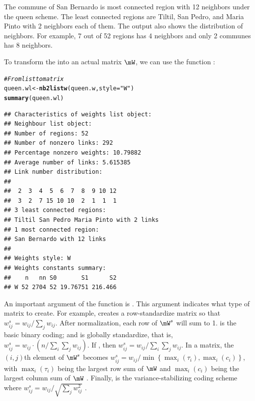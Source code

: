 \documentclass[english,12pt]{book}\usepackage[]{graphicx}\usepackage[]{xcolor}
\makeatletter
\newcommand{\hlstr}[1]{\textcolor[rgb]{0.192,0.494,0.8}{#1}}%
\newcommand{\hlcom}[1]{\textcolor[rgb]{0.678,0.584,0.686}{\textit{#1}}}%
\newcommand{\hlstd}[1]{\textcolor[rgb]{0.345,0.345,0.345}{#1}}%
\newcommand{\hlkwb}[1]{\textcolor[rgb]{0.69,0.353,0.396}{#1}}%
\newcommand{\hlkwc}[1]{\textcolor[rgb]{0.333,0.667,0.333}{#1}}%
\newcommand{\hlkwd}[1]{\textcolor[rgb]{0.737,0.353,0.396}{\textbf{#1}}}%
\newenvironment{kframe}{%
 \def\at@end@of@kframe{}%
 \ifinner\ifhmode%
  \def\at@end@of@kframe{\end{minipage}}%
  \begin{minipage}{\columnwidth}%
 \fi\fi%
 \def\FrameCommand##1{\hskip\@totalleftmargin \hskip-\fboxsep
 \colorbox{shadecolor}{##1}\hskip-\fboxsep
     \hskip-\linewidth \hskip-\@totalleftmargin \hskip\columnwidth}%
 \MakeFramed {\advance\hsize-\width
   \@totalleftmargin\z@ \linewidth\hsize
   \@setminipage}}%
 {\par\unskip\endMakeFramed%
 \at@end@of@kframe}
\newenvironment{knitrout}{}{} %
\makeatother
\begin{document}
The commune of San Bernardo is most connected region with 12 neighbors under the queen scheme. The least connected regions are Tiltil, San Pedro, and Maria Pinto with 2 neighbors each of them. The output also shows the distribution of neighbors.  For example, 7 out of 52 regions has 4 neighbors and only 2 communes has 8 neighbors.  

To transform the  into an actual matrix $\mW$, we can use the function :


\begin{knitrout}
\color{fgcolor}\begin{kframe}
\begin{alltt}
\hlcom{# From list to matrix}
\hlstd{queen.wl} \hlkwb{<-} \hlkwd{nb2listw}\hlstd{(queen.w,} \hlkwc{style} \hlstd{=} \hlstr{"W"}\hlstd{)}
\hlkwd{summary}\hlstd{(queen.wl)}
\end{alltt}
\begin{verbatim}
## Characteristics of weights list object:
## Neighbour list object:
## Number of regions: 52 
## Number of nonzero links: 292 
## Percentage nonzero weights: 10.79882 
## Average number of links: 5.615385 
## Link number distribution:
## 
##  2  3  4  5  6  7  8  9 10 12 
##  3  2  7 15 10 10  2  1  1  1 
## 3 least connected regions:
## Tiltil San Pedro Maria Pinto with 2 links
## 1 most connected region:
## San Bernardo with 12 links
## 
## Weights style: W 
## Weights constants summary:
##    n   nn S0       S1      S2
## W 52 2704 52 19.76751 216.466
\end{verbatim}
\end{kframe}
\end{knitrout}

An important argument of the function is . This argument indicates what type of matrix to create. For example,  creates a row-standardize matrix so that $w^s_{ij} = w_{ij}/ \sum_j w_{ij}$. After normalization, each row of $\mW^s$ will sum to 1.  is the basic binary coding; and  is globally standardize, that is, $w^s_{ij} = w_{ij} \cdot (n/ \sum_{i}\sum_j w_{ij})$. If , then $w^s_{ij} = w_{ij}/ \sum_i\sum_j w_{ij}$. In a  matrix, the $(i,j)$th element of $\mW^s$  becomes $w^s_{ij} = w_{ij} / \min\left\lbrace \max_i(\tau_i), \max_i(c_i)\right\rbrace$, with $\max_i(\tau_i)$ being the largest row sum of $\mW$ and $\max_i(c_i)$ being the largest column sum of $\mW$ \citep{kelejian2010specification}. Finally,  is the variance-stabilizing coding scheme where $w^s_{ij} = w_{ij}/ \sqrt{\sum_j w_{ij} ^2}$ \citep{tiefelsdorf1999variance}. 
\end{document}
